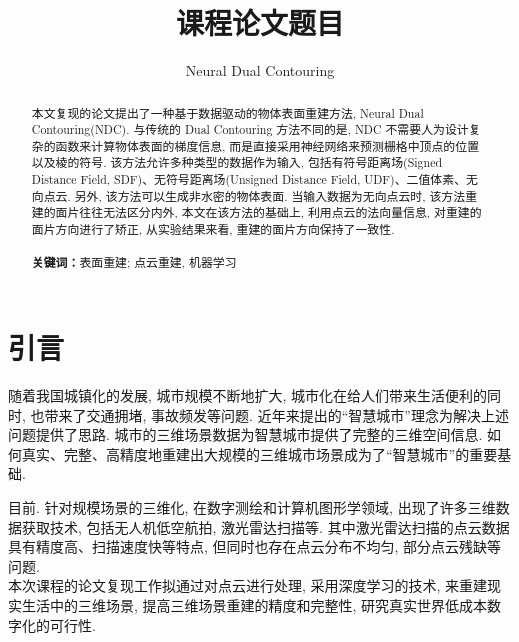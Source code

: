 
\usepackage[algo2e]{algorithm2e}
\usepackage{tabularx}
\usepackage{graphicx}
\usepackage{listings}
\usepackage{xcolor}

\title{课程论文题目}
\author{Neural Dual Contouring}

 
\maketitle

\begin{abstract}
 	本文复现的论文提出了一种基于数据驱动的物体表面重建方法, Neural Dual Contouring(NDC). 与传统的 Dual Contouring 方法不同的是, NDC 不需要人为设计复杂的函数来计算物体表面的梯度信息, 而是直接采用神经网络来预测栅格中顶点的位置以及棱的符号. 该方法允许多种类型的数据作为输入, 包括有符号距离场(Signed Distance Field, SDF)、无符号距离场(Unsigned Distance Field, UDF)、二值体素、无向点云. 另外, 该方法可以生成非水密的物体表面. 当输入数据为无向点云时, 该方法重建的面片往往无法区分内外, 本文在该方法的基础上, 利用点云的法向量信息, 对重建的面片方向进行了矫正, 从实验结果来看, 重建的面片方向保持了一致性. 
 	\\\\
 	\textbf{关键词：}表面重建; 点云重建, 机器学习
\end{abstract}

\section{引言}

随着我国城镇化的发展, 城市规模不断地扩大, 城市化在给人们带来生活便利的同时, 也带来了交通拥堵, 事故频发等问题. 近年来提出的“智慧城市”理念为解决上述问题提供了思路. 城市的三维场景数据为智慧城市提供了完整的三维空间信息. 如何真实、完整、高精度地重建出大规模的三维城市场景成为了“智慧城市”的重要基础. 

目前. 针对规模场景的三维化, 在数字测绘和计算机图形学领域, 出现了许多三维数据获取技术, 包括无人机低空航拍, 激光雷达扫描等. 其中激光雷达扫描的点云数据具有精度高、扫描速度快等特点, 但同时也存在点云分布不均匀, 部分点云残缺等问题. \\
本次课程的论文复现工作拟通过对点云进行处理, 采用深度学习的技术, 来重建现实生活中的三维场景, 提高三维场景重建的精度和完整性, 研究真实世界低成本数字化的可行性. 


